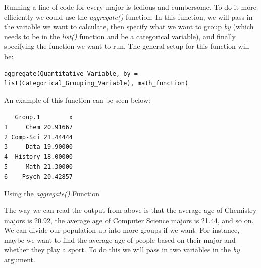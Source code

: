 \documentclass[
  letterpaper,
  DIV=11,
  numbers=noendperiod]{scrreprt}
\newenvironment{Shaded}{\begin{snugshade}}{\end{snugshade}}
\newcommand{\AttributeTok}[1]{\textcolor[rgb]{0.40,0.45,0.13}{#1}}
\newcommand{\FunctionTok}[1]{\textcolor[rgb]{0.28,0.35,0.67}{#1}}
\newcommand{\NormalTok}[1]{\textcolor[rgb]{0.00,0.23,0.31}{#1}}
\newcommand{\SpecialCharTok}[1]{\textcolor[rgb]{0.37,0.37,0.37}{#1}}
\begin{document}
Running a line of code for every major is tedious and cumbersome. To do
it more efficiently we could use the \emph{aggregate()} function. In
this function, we will pass in the variable we want to calculate, then
specify what we want to group \emph{by} (which needs to be in the
\emph{list()} function and be a categorical variable), and finally
specifying the function we want to run. The general setup for this
function will be:

\begin{verbatim}
aggregate(Quantitative_Variable, by = list(Categorical_Grouping_Variable), math_function)
\end{verbatim}

An example of this function can be seen below:

\begin{Shaded}
\end{Shaded}

\begin{verbatim}
   Group.1        x
1     Chem 20.91667
2 Comp-Sci 21.44444
3     Data 19.90000
4  History 18.00000
5     Math 21.30000
6    Psych 20.42857
\end{verbatim}

\begin{watch}{}{}
    \href{https://youtu.be/k5Wgr1VVUhw}{Using the \textit{aggregate()} Function}
\end{watch}

The way we can read the output from above is that the average age of
Chemistry majors is 20.92, the average age of Computer Science majors is
21.44, and so on. We can divide our population up into more groups if we
want. For instance, maybe we want to find the average age of people
based on their major and whether they play a sport. To do this we will
pass in two variables in the \emph{by} argument.

\begin{Shaded}
\end{Shaded}
\end{document}
